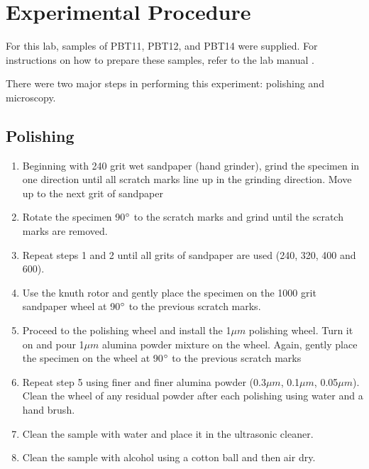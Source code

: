 \documentclass[11pt]{article}
\begin{document}
\section{Experimental Procedure \cite{manual}}
For this lab, samples of PBT11, PBT12, and PBT14 were supplied. For instructions on how to prepare these samples, refer to the lab manual \cite{manual}.

There were two major steps in performing this experiment: polishing and microscopy.

\subsection{Polishing}
\begin{enumerate}
\item Beginning with 240 grit wet sandpaper (hand grinder), grind the specimen in one direction until all scratch marks line up in the grinding direction. Move up to the next grit of sandpaper

\item Rotate the specimen 90\(\degree\) to the scratch marks and grind until the scratch marks are removed.

\item Repeat steps 1 and 2 until all grits of sandpaper are used (240, 320, 400 and 600).

\item Use the knuth rotor and gently place the specimen on the 1000 grit sandpaper wheel at 90\(\degree\) to the previous scratch marks.

\item Proceed to the polishing wheel and install the 1\(\mu m\) polishing wheel. Turn it on and pour 1\(\mu m\) alumina powder mixture on the wheel. Again, gently place the specimen on the wheel at 90\(\degree\) to the previous scratch marks

\item Repeat step 5 using finer and finer alumina powder (0.3\(\mu m\), 0.1\(\mu m\), 0.05\(\mu m\)). Clean the wheel of any residual powder after each polishing using water and a hand brush.

\item Clean the sample with water and place it in the ultrasonic cleaner.

\item Clean the sample with alcohol using a cotton ball and then air dry.
\end{enumerate}
\end{document}
